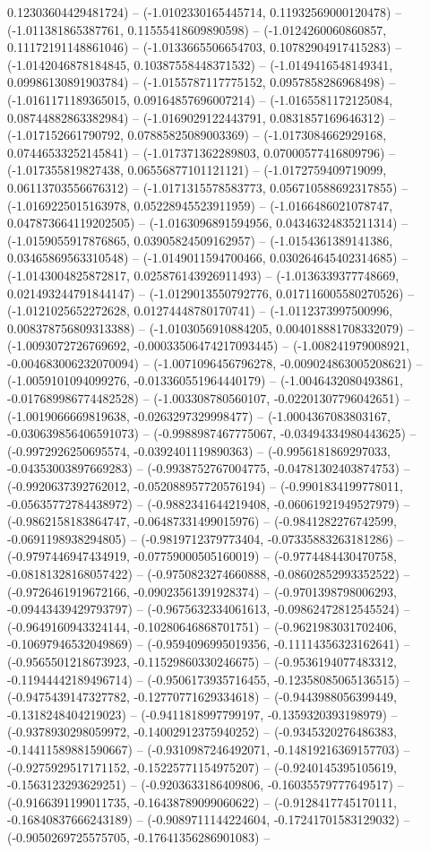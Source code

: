0.12303604429481724) -- (-1.0102330165445714, 0.11932569000120478) -- (-1.011381865387761, 0.11555418609890598) -- (-1.0124260060860857, 0.11172191148861046) -- (-1.0133665506654703, 0.10782904917415283) -- (-1.0142046878184845, 0.10387558448371532) -- (-1.0149416548149341, 0.09986130891903784) -- (-1.0155787117775152, 0.0957858286968498) -- (-1.0161171189365015, 0.09164857696007214) -- (-1.0165581172125084, 0.08744882863382984) -- (-1.0169029122443791, 0.0831857169646312) -- (-1.017152661790792, 0.07885825089003369) -- (-1.0173084662929168, 0.07446533252145841) -- (-1.017371362289803, 0.07000577416809796) -- (-1.017355819827438, 0.06556877101121121) -- (-1.0172759409719099, 0.06113703556676312) -- (-1.0171315578583773, 0.056710588692317855) -- (-1.0169225015163978, 0.05228945523911959) -- (-1.0166486021078747, 0.047873664119202505) -- (-1.0163096891594956, 0.04346324835211314) -- (-1.0159055917876865, 0.03905824509162957) -- (-1.0154361389141386, 0.03465869563310548) -- (-1.0149011594700466, 0.030264645402314685) -- (-1.0143004825872817, 0.025876143926911493) -- (-1.0136339377748669, 0.021493244791844147) -- (-1.0129013550792776, 0.017116005580270526) -- (-1.0121025652272628, 0.01274448780170741) -- (-1.0112373997500996, 0.008378756809313388) -- (-1.0103056910884205, 0.004018881708332079) -- (-1.0093072726769692, -0.00033506474217093445) -- (-1.008241979008921, -0.004683006232070094) -- (-1.0071096456796278, -0.009024863005208621) -- (-1.0059101094099276, -0.013360551964440179) -- (-1.0046432080493861, -0.017689986774482528) -- (-1.003308780560107, -0.02201307796042651) -- (-1.0019066669819638, -0.0263297329998477) -- (-1.0004367083803167, -0.030639856406591073) -- (-0.9988987467775067, -0.03494334980443625) -- (-0.9972926250695574, -0.0392401119890363) -- (-0.9956181869297033, -0.04353003897669283) -- (-0.9938752767004775, -0.04781302403874753) -- (-0.9920637392762012, -0.052088957720576194) -- (-0.9901834199778011, -0.05635772784438972) -- (-0.9882341644219408, -0.06061921949527979) -- (-0.9862158183864747, -0.06487331499015976) -- (-0.9841282276742599, -0.0691198938294805) -- (-0.9819712379773404, -0.07335883263181286) -- (-0.9797446947434919, -0.07759000505160019) -- (-0.9774484430470758, -0.08181328168057422) -- (-0.9750823274660888, -0.08602852993352522) -- (-0.9726461919672166, -0.09023561391928374) -- (-0.9701398798006293, -0.09443439429793797) -- (-0.9675632334061613, -0.09862472812545524) -- (-0.9649160943324144, -0.10280646868701751) -- (-0.9621983031702406, -0.10697946532049869) -- (-0.9594096995019356, -0.11114356323162641) -- (-0.9565501218673923, -0.11529860330246675) -- (-0.9536194077483312, -0.11944442189496714) -- (-0.9506173935716455, -0.12358085065136515) -- (-0.9475439147327782, -0.12770771629334618) -- (-0.9443988056399449, -0.1318248404219023) -- (-0.9411818997799197, -0.1359320393198979) -- (-0.9378930298059972, -0.14002912375940252) -- (-0.9345320276486383, -0.14411589881590667) -- (-0.9310987246492071, -0.14819216369157703) -- (-0.9275929517171152, -0.15225771154975207) -- (-0.9240145395105619, -0.1563123293629251) -- (-0.9203633186409806, -0.16035579777649517) -- (-0.9166391199011735, -0.16438789099060622) -- (-0.9128417745170111, -0.16840837666243189) -- (-0.9089711144224604, -0.17241701583129032) -- (-0.9050269725575705, -0.17641356286901083) -- 